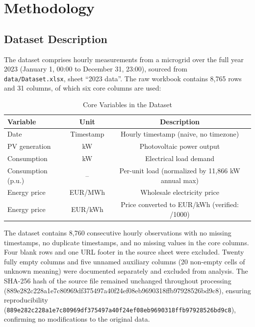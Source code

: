 \documentclass[conference]{IEEEtran}
\begin{document}
\section{Methodology}
\label{sec:methodology}

\subsection{Dataset Description}
\label{sec:dataset}

The dataset comprises hourly measurements from a microgrid over the full year 2023 (January 1, 00:00 to December 31, 23:00), sourced from \texttt{data/Dataset.xlsx}, sheet ``2023 data''. The raw workbook contains 8,765 rows and 31 columns, of which six core columns are used:

\begin{table}[htbp]
\caption{Core Variables in the Dataset}
\label{tab:variables}
\begin{center}
\begin{tabular}{lcc}
\toprule
\textbf{Variable} & \textbf{Unit} & \textbf{Description} \\
\midrule
Date & Timestamp & Hourly timestamp (naive, no timezone) \\
PV generation & kW & Photovoltaic power output \\
Consumption & kW & Electrical load demand \\
Consumption (p.u.) & -- & Per-unit load (normalized by 11,866 kW annual max) \\
Energy price & EUR/MWh & Wholesale electricity price \\
Energy price & EUR/kWh & Price converted to EUR/kWh (verified: /1000) \\
\bottomrule
\end{tabular}
\end{center}
\end{table}

The dataset contains 8,760 consecutive hourly observations with no missing timestamps, no duplicate timestamps, and no missing values in the core columns. Four blank rows and one URL footer in the source sheet were excluded. Twenty fully empty columns and five unnamed auxiliary columns (20 non-empty cells of unknown meaning) were documented separately and excluded from analysis. The SHA-256 hash of the source file remained unchanged throughout processing (889e282c228a1e7c80969df375497a40f24ef08eb9690318ffb97928526bd9c8), ensuring reproducibility (\texttt{889e282c228a1e7c80969df375497a40f24ef08eb9690318ffb97928526bd9c8}), confirming no modifications to the original data.
\end{document}
